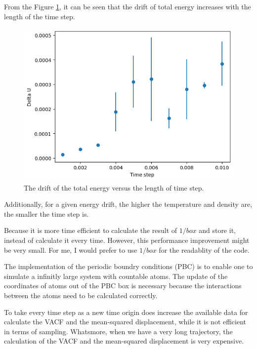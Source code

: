 \documentclass{assignmeownt}
\begin{document}

From the Figure \ref{fig:drift_ts}, it can be seen that the drift of total energy increases with the length of the time step.

\begin{figure}
    \centering
    \includegraphics[width=0.5\linewidth]{../block2/4-MDLennarJones/Results/drift_ts.png}
    \caption{The drift of the total energy versus the length of time step.}
    \label{fig:drift_ts}
\end{figure}

Additionally, for a given energy drift, the higher the temperature and density are, the smaller the time step is.

Because it is more time efficient to calculate the result of $1 / box$ and store it, instead of calculate it every time. However, this performance improvement might be very small. For me, I would prefer to use $1 / box$ for the readablity of the code.


The implementation of the periodic boundry conditions (PBC) is to enable one to simulate a infinitly large system with countable atoms. The update of the coordinates of atoms out of the PBC box is necessary because the interactions between the atoms need to be calculated correctly.

To take every time step as a new time origin does increase the available data for calculate the VACF and the mean-squared displacement, while it is not efficient in terms of sampling. Whatsmore, when we have a very long trajectory, the calculation of the VACF and the mean-squared displacement is very expensive.
\end{document}
